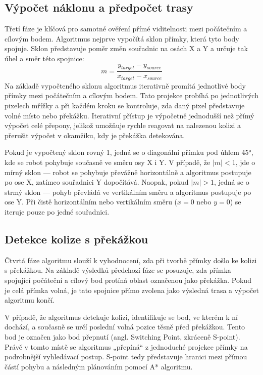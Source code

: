 \documentclass[10pt, a4paper]{article}
\begin{document}
\newpage
\subsection{Výpočet náklonu a předpočet trasy}
Třetí fáze je klíčová pro samotné ověření přímé viditelnosti mezi počátečním a cílovým bodem.
Algoritmus nejprve vypočítá sklon přímky, která tyto body spojuje.
Sklon představuje poměr změn souřadnic na osách X a Y a určuje tak úhel a směr této spojnice:
$$ m = \frac{y_{target} - y_{source}}{x_{target} - x_{source}} $$
Na základě vypočteného sklonu algoritmus iterativně promítá jednotlivé body přímky mezi počátečním a cílovým bodem.
Tato projekce probíhá po jednotlivých pixelech mřížky a při každém kroku se kontroluje, zda daný pixel představuje volné místo nebo překážku.
Iterativní přístup je výpočetně jednodušší než přímý výpočet celé přepony, jelikož umožňuje rychle reagovat na nalezenou kolizi a přerušit výpočet v okamžiku, kdy je překážka detekována.

Pokud je vypočtený sklon rovný 1, jedná se o diagonální přímku pod úhlem 45°, kde se robot pohybuje současně ve směru osy X i Y.
V případě, že $|m| < 1$, jde o mírný sklon — robot se pohybuje převážně horizontálně a algoritmus postupuje po ose X, zatímco souřadnici Y dopočítává.
Naopak, pokud $|m| > 1$, jedná se o strmý sklon — pohyb převládá ve vertikálním směru a algoritmus postupuje po ose Y.
Při čistě horizontálním nebo vertikálním směru ($x = 0$ nebo $y = 0$) se iteruje pouze po jedné souřadnici.

\subsection{Detekce kolize s překážkou}
Čtvrtá fáze algoritmu slouží k vyhodnocení, zda při tvorbě přímky došlo ke kolizi s překážkou.
Na základě výsledků předchozí fáze se posuzuje, zda přímka spojující počáteční a cílový bod protíná oblast označenou jako překážka.
Pokud je celá přímka volná, je tato spojnice přímo zvolena jako výsledná trasa \newline a výpočet algoritmu končí.

V případě, že algoritmus detekuje kolizi, identifikuje se bod, ve kterém \newline k ní dochází, a současně se určí poslední volná pozice těsně před překážkou.
Tento bod je označen jako bod přepnutí (angl. Switching Point, zkráceně \newline S-point).
Právě v tomto místě se algoritmus „přepíná“ z jednoduché  projekce přímky na podrobnější vyhledávací postup.
S-point tedy představuje hranici mezi přímou částí pohybu a následným plánováním pomocí A* algoritmu.
\end{document}
